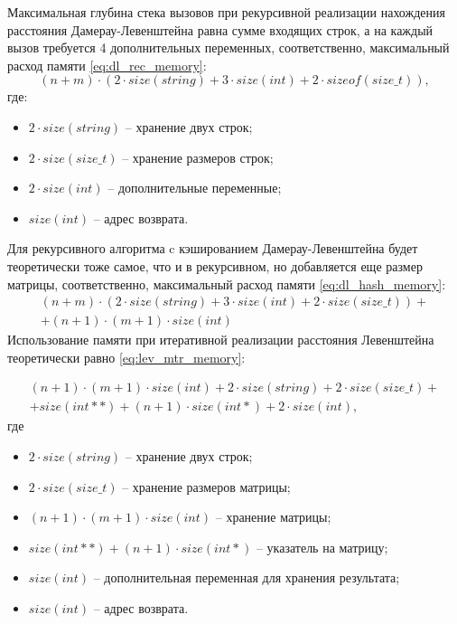 Максимальная глубина стека вызовов при рекурсивной реализации нахождения расстояния Дамерау-Левенштейна равна сумме входящих строк, а на каждый вызов требуется 4 дополнительных переменных, соответственно, максимальный расход памяти \ref{eq:dl_rec_memory}:
\begin{equation}
	\label{eq:dl_rec_memory}
	(n + m) \cdot (2 \cdot size(string) + 3 \cdot size(int) + 2 \cdot sizeof(size\_t)),
\end{equation}
где:
\begin{itemize}
	\item $2 \cdot size(string)$ -- хранение двух строк;
	\item $2 \cdot size(size\_t)$ -- хранение размеров строк;
	\item $2 \cdot size(int)$ -- дополнительные переменные;
	\item $size(int)$ -- адрес возврата.
\end{itemize}

Для рекурсивного алгоритма c кэшированием Дамерау-Левенштейна будет теоретически тоже самое, что и в рекурсивном, но добавляется еще размер матрицы, соответственно, максимальный расход памяти \ref{eq:dl_hash_memory}:
\begin{equation}
	\label{eq:dl_hash_memory}
	\begin{aligned}
		(n + m) \cdot (2 \cdot size(string) + 3 \cdot size(int) + 2 \cdot size(size\_t)) + \\
		+ (n + 1) \cdot (m + 1) \cdot size(int)
	\end{aligned}
\end{equation}
Использование памяти при итеративной реализации расстояния Левенштейна теоретически равно \ref{eq:lev_mtr_memory}:

\begin{equation}
	\label{eq:lev_mtr_memory}
	\begin{aligned}
		(n + 1) \cdot (m + 1) \cdot size(int) + 2 \cdot size(string) + 2 \cdot size(size\_t) + \\
		+ size(int **) + (n + 1) \cdot size(int *) + 2 \cdot size(int),
	\end{aligned}
\end{equation}
где 
\begin{itemize}
	\item $2 \cdot size(string)$ -- хранение двух строк;
	\item $2 \cdot size(size\_t)$ -- хранение размеров матрицы;
	\item $(n + 1) \cdot (m + 1) \cdot size(int)$ -- хранение матрицы;
	\item $size(int **) + (n + 1) \cdot size(int *)$ -- указатель на матрицу;
	\item $size(int)$ -- дополнительная переменная для хранения результата;
	\item $size(int)$ -- адрес возврата.
\end{itemize}

